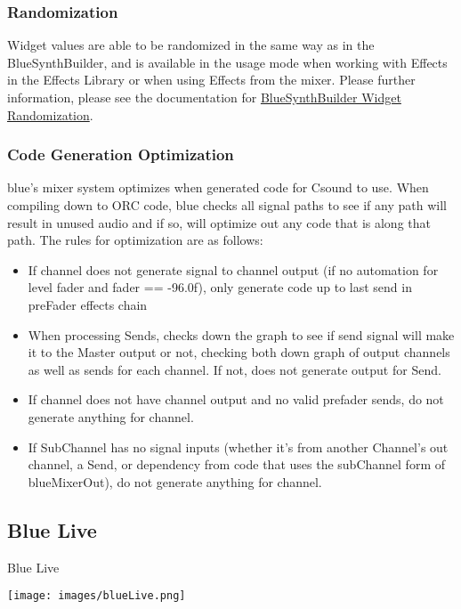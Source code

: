 \subsubsection{Randomization}

Widget values are able to be randomized in the same way as in the
BlueSynthBuilder, and is available in the usage mode when working with
Effects in the Effects Library or when using Effects from the mixer.
Please further information, please see the documentation for
\protect\hyperlink{bsbWidgetRandomization}{BlueSynthBuilder Widget
Randomization}.

\subsubsection{Code Generation Optimization}

blue's mixer system optimizes when generated code for Csound to use.
When compiling down to ORC code, blue checks all signal paths to see if
any path will result in unused audio and if so, will optimize out any
code that is along that path. The rules for optimization are as follows:

\begin{itemize}
\item
  If channel does not generate signal to channel output (if no
  automation for level fader and fader == -96.0f), only generate code up
  to last send in preFader effects chain
\item
  When processing Sends, checks down the graph to see if send signal
  will make it to the Master output or not, checking both down graph of
  output channels as well as sends for each channel. If not, does not
  generate output for Send.
\item
  If channel does not have channel output and no valid prefader sends,
  do not generate anything for channel.
\item
  If SubChannel has no signal inputs (whether it's from another
  Channel's out channel, a Send, or dependency from code that uses the
  subChannel form of blueMixerOut), do not generate anything for
  channel.
\end{itemize}

\subsection{Blue Live}\label{blueLive}

Blue Live

\texttt{[image: images/blueLive.png]}

